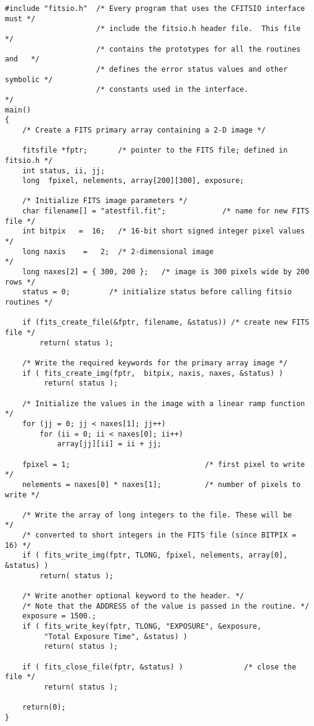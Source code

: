 \begin{verbatim}
#include "fitsio.h"  /* Every program that uses the CFITSIO interface must */
                     /* include the fitsio.h header file.  This file       */
                     /* contains the prototypes for all the routines and   */
                     /* defines the error status values and other symbolic */
                     /* constants used in the interface.                   */
main()
{
    /* Create a FITS primary array containing a 2-D image */

    fitsfile *fptr;       /* pointer to the FITS file; defined in fitsio.h */
    int status, ii, jj;
    long  fpixel, nelements, array[200][300], exposure;

    /* Initialize FITS image parameters */
    char filename[] = "atestfil.fit";             /* name for new FITS file */
    int bitpix   =  16;   /* 16-bit short signed integer pixel values       */
    long naxis    =   2;  /* 2-dimensional image                            */
    long naxes[2] = { 300, 200 };   /* image is 300 pixels wide by 200 rows */
    status = 0;         /* initialize status before calling fitsio routines */

    if (fits_create_file(&fptr, filename, &status)) /* create new FITS file */
        return( status );

    /* Write the required keywords for the primary array image */
    if ( fits_create_img(fptr,  bitpix, naxis, naxes, &status) )
         return( status );

    /* Initialize the values in the image with a linear ramp function */
    for (jj = 0; jj < naxes[1]; jj++)
        for (ii = 0; ii < naxes[0]; ii++)
            array[jj][ii] = ii + jj;

    fpixel = 1;                               /* first pixel to write      */
    nelements = naxes[0] * naxes[1];          /* number of pixels to write */

    /* Write the array of long integers to the file. These will be      */
    /* converted to short integers in the FITS file (since BITPIX = 16) */
    if ( fits_write_img(fptr, TLONG, fpixel, nelements, array[0], &status) )
        return( status );

    /* Write another optional keyword to the header. */
    /* Note that the ADDRESS of the value is passed in the routine. */
    exposure = 1500.;
    if ( fits_write_key(fptr, TLONG, "EXPOSURE", &exposure,
         "Total Exposure Time", &status) )
         return( status );

    if ( fits_close_file(fptr, &status) )              /* close the file */
         return( status );

    return(0);
}
\end{verbatim}

